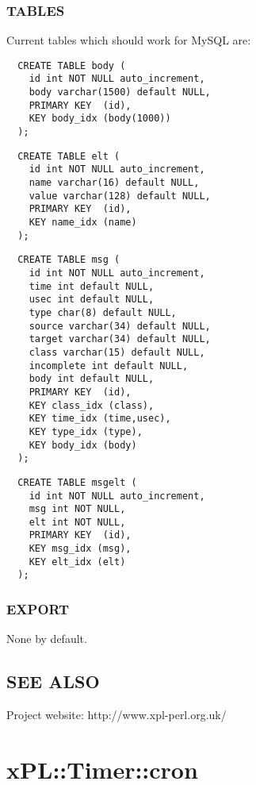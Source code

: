 \subsubsection*{TABLES\label{xPL::SQL_TABLES}}


Current tables which should work for MySQL are:

\begin{verbatim}
  CREATE TABLE body (
    id int NOT NULL auto_increment,
    body varchar(1500) default NULL,
    PRIMARY KEY  (id),
    KEY body_idx (body(1000))
  );
\end{verbatim}
\begin{verbatim}
  CREATE TABLE elt (
    id int NOT NULL auto_increment,
    name varchar(16) default NULL,
    value varchar(128) default NULL,
    PRIMARY KEY  (id),
    KEY name_idx (name)
  );
\end{verbatim}
\begin{verbatim}
  CREATE TABLE msg (
    id int NOT NULL auto_increment,
    time int default NULL,
    usec int default NULL,
    type char(8) default NULL,
    source varchar(34) default NULL,
    target varchar(34) default NULL,
    class varchar(15) default NULL,
    incomplete int default NULL,
    body int default NULL,
    PRIMARY KEY  (id),
    KEY class_idx (class),
    KEY time_idx (time,usec),
    KEY type_idx (type),
    KEY body_idx (body)
  );
\end{verbatim}
\begin{verbatim}
  CREATE TABLE msgelt (
    id int NOT NULL auto_increment,
    msg int NOT NULL,
    elt int NOT NULL,
    PRIMARY KEY  (id),
    KEY msg_idx (msg),
    KEY elt_idx (elt)
  );
\end{verbatim}
\subsubsection*{EXPORT\label{xPL::SQL_EXPORT}}


None by default.

\subsection*{SEE ALSO\label{xPL::SQL_SEE_ALSO}}


Project website: http://www.xpl-perl.org.uk/

\section{xPL::Timer::cron\label{xPL::Timer::cron}}


